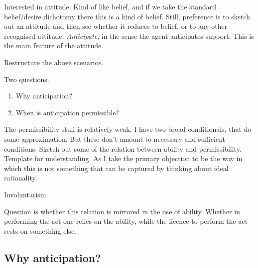 \documentclass[10pt]{article}
\begin{document}
{
  \color{red}
  Interested in attitude.
  Kind of like belief, and if we take the standard belief/desire dichotomy there this is a kind of belief.
  Still, preference is to sketch out an attitude and then see whether it reduces to belief, or to any other recognised attitude.
  \emph{Anticipate}, in the sense the agent anticipates support.
  This is the main feature of the attitude.

  Restructure the above scenarios.
}

Two questions.
\begin{enumerate}
\item Why anticipation?
\item When is anticipation permissible?
\end{enumerate}

{
  \color{red}
  The permissibility stuff is relatively weak.
  I have two broad conditionals, that do some approximation.
  But these don't amount to necessary and sufficient conditions.
  Sketch out some of the relation between ability and permissibility.
  Template for understanding.
  As I take the primary objection to be the way in which this is not something that can be captured by thinking about ideal rationality.

  Involuntarism.
}

Question is whether this relation is mirrored in the use of ability.
Whether in performing the act one relies on the ability, while the licence to perform the act rests on something else.


\subsection{Why anticipation?}
\label{sec:why-anticipation}
\end{document}
